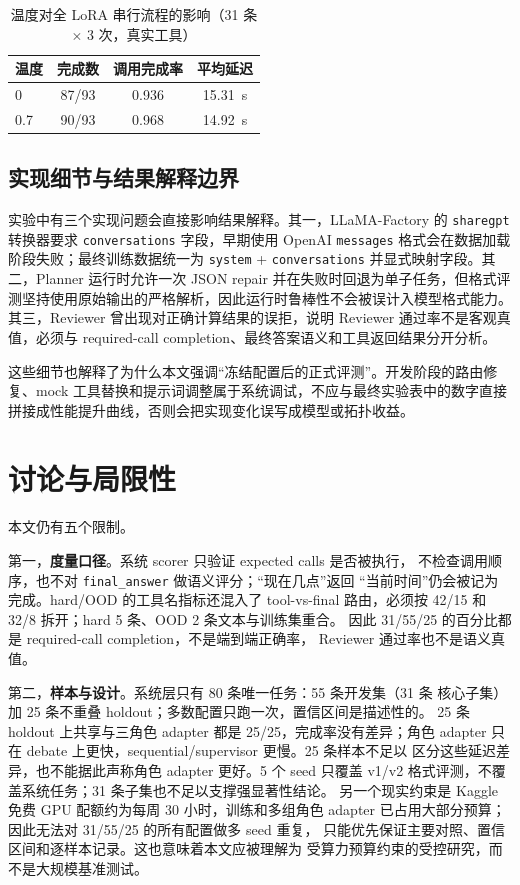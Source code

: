 \documentclass[UTF8,a4paper,12pt]{ctexart}
\begin{document}
\begin{table}[H]
  \centering
  \small
  \caption{温度对全 LoRA 串行流程的影响（31 条 $\times$ 3 次，真实工具）}
  \label{tab:temperature}
  \begin{tabular}{lccc}
    \toprule
    温度 & 完成数 & 调用完成率 & 平均延迟 \\
    \midrule
    0 & 87/93 & 0.936 & 15.31~s \\
    0.7 & 90/93 & 0.968 & 14.92~s \\
    \bottomrule
  \end{tabular}
\end{table}

\subsection{实现细节与结果解释边界}
实验中有三个实现问题会直接影响结果解释。其一，LLaMA-Factory 的 \texttt{sharegpt} 转换器要求 \texttt{conversations} 字段，早期使用 OpenAI \texttt{messages} 格式会在数据加载阶段失败；最终训练数据统一为 \texttt{system} + \texttt{conversations} 并显式映射字段。其二，Planner 运行时允许一次 JSON repair 并在失败时回退为单子任务，但格式评测坚持使用原始输出的严格解析，因此运行时鲁棒性不会被误计入模型格式能力。其三，Reviewer 曾出现对正确计算结果的误拒，说明 Reviewer 通过率不是客观真值，必须与 required-call completion、最终答案语义和工具返回结果分开分析。

这些细节也解释了为什么本文强调“冻结配置后的正式评测”。开发阶段的路由修复、mock 工具替换和提示词调整属于系统调试，不应与最终实验表中的数字直接拼接成性能提升曲线，否则会把实现变化误写成模型或拓扑收益。

\clearpage
\section{讨论与局限性}
本文仍有五个限制。

第一，\textbf{度量口径}。系统 scorer 只验证 expected calls 是否被执行，
不检查调用顺序，也不对 \texttt{final\_answer} 做语义评分；“现在几点”返回
“当前时间”仍会被记为完成。hard/OOD 的工具名指标还混入了 tool-vs-final
路由，必须按 42/15 和 32/8 拆开；hard 5 条、OOD 2 条文本与训练集重合。
因此 31/55/25 的百分比都是 required-call completion，不是端到端正确率，
Reviewer 通过率也不是语义真值。

第二，\textbf{样本与设计}。系统层只有 80 条唯一任务：55 条开发集（31 条
核心子集）加 25 条不重叠 holdout；多数配置只跑一次，置信区间是描述性的。
25 条 holdout 上共享与三角色 adapter 都是 25/25，完成率没有差异；角色
adapter 只在 debate 上更快，sequential/supervisor 更慢。25 条样本不足以
区分这些延迟差异，也不能据此声称角色 adapter 更好。5 个 seed 只覆盖
v1/v2 格式评测，不覆盖系统任务；31 条子集也不足以支撑强显著性结论。
另一个现实约束是 Kaggle 免费 GPU 配额约为每周 30 小时，训练和多组角色
adapter 已占用大部分预算；因此无法对 31/55/25 的所有配置做多 seed 重复，
只能优先保证主要对照、置信区间和逐样本记录。这也意味着本文应被理解为
受算力预算约束的受控研究，而不是大规模基准测试。
\end{document}
